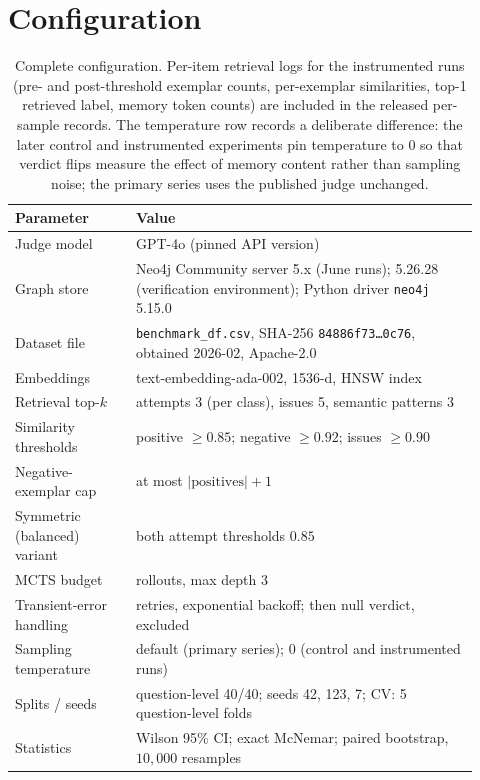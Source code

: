 \documentclass[]{ceurart}
\begin{document}
\section{Configuration}
\label{app:config}

\begin{table}[h]
\centering
\footnotesize
\caption{Complete configuration. Per-item retrieval logs for the instrumented runs (pre- and post-threshold exemplar counts, per-exemplar similarities, top-1 retrieved label, memory token counts) are included in the released per-sample records. The temperature row records a deliberate difference: the later control and instrumented experiments pin temperature to $0$ so that verdict flips measure the effect of memory content rather than sampling noise; the primary series uses the published judge unchanged.}
\label{tab:config}
\begin{tabular}{>{\raggedright\arraybackslash}p{0.24\linewidth}>{\raggedright\arraybackslash}p{0.68\linewidth}}
\toprule
Parameter & Value \\
\midrule
Judge model & GPT-4o (pinned API version) \\
Graph store & Neo4j Community server 5.x (June runs); 5.26.28 (verification environment); Python driver \texttt{neo4j} 5.15.0 \\
Dataset file & \texttt{benchmark\_df.csv}, SHA-256 \texttt{84886f73\ldots0c76}, obtained 2026-02, Apache-2.0 \\
Embeddings & text-embedding-ada-002, 1536-d, HNSW index \\
Retrieval top-$k$ & attempts 3 (per class), issues 5, semantic patterns 3 \\
Similarity thresholds & positive $\ge0.85$; negative $\ge0.92$; issues $\ge0.90$ \\
Negative-exemplar cap & at most $|\text{positives}|+1$ \\
Symmetric (balanced) variant & both attempt thresholds $0.85$ \\
MCTS budget & 2 rollouts, max depth 3 \\
Transient-error handling & 5 retries, exponential backoff; then null verdict, excluded \\
Sampling temperature & default (primary series); $0$ (control and instrumented runs) \\
Splits / seeds & question-level 40/40; seeds 42, 123, 7; CV: 5 question-level folds \\
Statistics & Wilson 95\% CI; exact McNemar; paired bootstrap, $10{,}000$ resamples \\
\bottomrule
\end{tabular}

\end{table}
\end{document}
